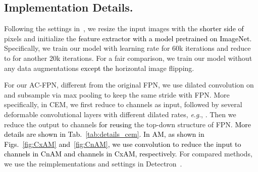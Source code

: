 \documentclass[journal]{IEEEtran}
\newcommand{\eg}{\textit{e}.\textit{g}.\xspace}
\def\qi{\textcolor{black}}
\def\myblue{\textcolor{black}}
\begin{document}
	
	
	
\subsection{Implementation Details.}

	
	Following the settings in~\cite{cai2018cascade,he2017mask,liu2018path}, we resize the input images with the \myblue{shorter side of}  pixels and initialize the \myblue{feature extractor with a model pretrained on ImageNet.}
Specifically, we train our model with learning rate  for 60k iterations and reduce to  for another 20k iterations. 
For a fair comparison, we train our model without any data augmentations \myblue{except the} horizontal image flipping.
	
	For our AC-FPN, different from the original FPN, we use dilated convolution on  and subsample  via max pooling to keep the same stride with FPN. More specifically, in CEM, we first reduce  to  channels as input, followed by several  deformable convolutional layers with different dilated rates, \eg, . Then we reduce the output to  channels \myblue{for reusing} the top-down structure of FPN.
	\qi{More details are shown in Tab.~\ref{tab:details_cem}.
	In AM, as shown in Figs.~\ref{fig:CxAM} and~\ref{fig:CnAM}, we use  convolution to reduce the input to  channels in CnAM and  channels in CxAM, respectively.} For compared methods, 
we use the reimplementations and settings in Detectron~\cite{girshick2018detectron}. 


	
\end{document}
